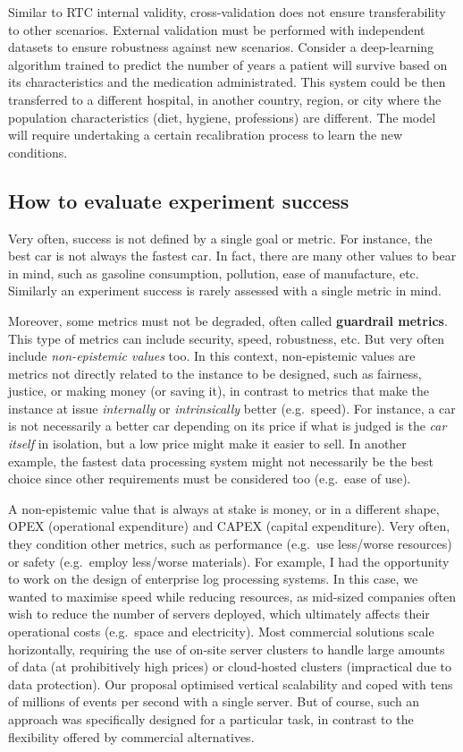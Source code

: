\documentclass[
]{book}
\begin{document}
Similar to RTC internal validity, cross-validation does not ensure transferability to other scenarios. External validation must be performed with independent datasets to ensure robustness against new scenarios. Consider a deep-learning algorithm trained to predict the number of years a patient will survive based on its characteristics and the medication administrated. This system could be then transferred to a different hospital, in another country, region, or city where the population characteristics (diet, hygiene, professions) are different. The model will require undertaking a certain recalibration process to learn the new conditions.

\hypertarget{how-to-evaluate-experiment-success}{%
\subsection{How to evaluate experiment success}\label{how-to-evaluate-experiment-success}}

Very often, success is not defined by a single goal or metric. For instance, the best car is not always the fastest car. In fact, there are many other values to bear in mind, such as gasoline consumption, pollution, ease of manufacture, etc. Similarly an experiment success is rarely assessed with a single metric in mind.

Moreover, some metrics must not be degraded, often called \textbf{guardrail metrics}. This type of metrics can include security, speed, robustness, etc. But very often include \emph{non-epistemic values} too. In this context, non-epistemic values are metrics not directly related to the instance to be designed, such as fairness, justice, or making money (or saving it), in contrast to metrics that make the instance at issue \emph{internally} or \emph{intrinsically} better (e.g.~speed). For instance, a car is not necessarily a better car depending on its price if what is judged is the \emph{car itself} in isolation, but a low price might make it easier to sell. In another example, the fastest data processing system might not necessarily be the best choice since other requirements must be considered too (e.g.~ease of use).

A non-epistemic value that is always at stake is money, or in a different shape, OPEX (operational expenditure) and CAPEX (capital expenditure). Very often, they condition other metrics, such as performance (e.g.~use less/worse resources) or safety (e.g.~employ less/worse materials). For example, I had the opportunity to work on the design of enterprise log processing systems. In this case, we wanted to maximise speed while reducing resources, as mid-sized companies often wish to reduce the number of servers deployed, which ultimately affects their operational costs (e.g.~space and electricity). Most commercial solutions scale horizontally, requiring the use of on-site server clusters to handle large amounts of data (at prohibitively high prices) or cloud-hosted clusters (impractical due to data protection). Our proposal optimised vertical scalability and coped with tens of millions of events per second with a single server. But of course, such an approach was specifically designed for a particular task, in contrast to the flexibility offered by commercial alternatives.
\end{document}
